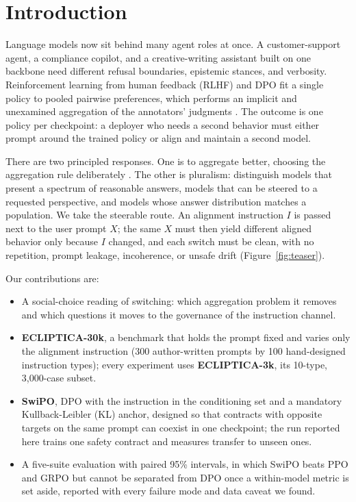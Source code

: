\documentclass[letterpaper]{article} %
\begin{document}
\section{Introduction}

Language models now sit behind many agent roles at once. A customer-support agent, a compliance copilot, and a creative-writing assistant built on one backbone need different refusal boundaries, epistemic stances, and verbosity. Reinforcement learning from human feedback (RLHF) and DPO \cite{rafailov2023direct} fit a single policy to pooled pairwise preferences, which performs an implicit and unexamined aggregation of the annotators' judgments \cite{conitzer2024social}. The outcome is one policy per checkpoint: a deployer who needs a second behavior must either prompt around the trained policy or align and maintain a second model.

There are two principled responses. One is to aggregate better, choosing the aggregation rule deliberately \cite{conitzer2024social}. The other is pluralism: \citet{sorensen2024roadmap} distinguish models that present a spectrum of reasonable answers, models that can be steered to a requested perspective, and models whose answer distribution matches a population. We take the steerable route. An alignment instruction $I$ is passed next to the user prompt $X$; the same $X$ must then yield different aligned behavior only because $I$ changed, and each switch must be clean, with no repetition, prompt leakage, incoherence, or unsafe drift (Figure~\ref{fig:teaser}).

Our contributions are:
\begin{itemize}
    \item A social-choice reading of switching: which aggregation problem it removes and which questions it moves to the governance of the instruction channel.
    \item \textbf{ECLIPTICA-30k}, a benchmark that holds the prompt fixed and varies only the alignment instruction (300 author-written prompts by 100 hand-designed instruction types); every experiment uses \textbf{ECLIPTICA-3k}, its 10-type, 3,000-case subset.
    \item \textbf{SwiPO}, DPO with the instruction in the conditioning set and a mandatory Kullback-Leibler (KL) anchor, designed so that contracts with opposite targets on the same prompt can coexist in one checkpoint; the run reported here trains one safety contract and measures transfer to unseen ones.
    \item A five-suite evaluation with paired 95\% intervals, in which SwiPO beats PPO and GRPO but cannot be separated from DPO once a within-model metric is set aside, reported with every failure mode and data caveat we found.
\end{itemize}
\end{document}
